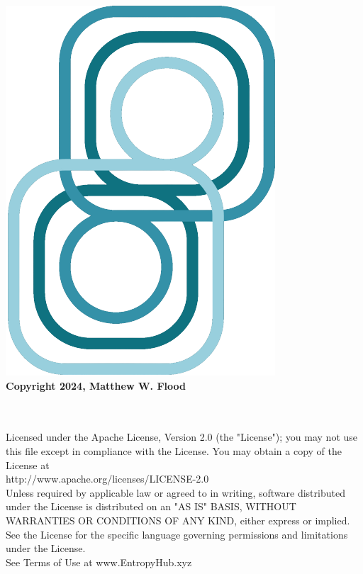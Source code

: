 \thispagestyle{plain}
	
\footnotesize

	\begingroup
	  \begin{center}	 
	  \vspace*{4cm} 
		\includegraphics[scale=.75]{EntropyHubLogo3.png}	\\	
		\vspace*{\fill}
	  \textbf{Copyright 2024, Matthew W. Flood}\\ \ \\ \
		\end{center}	   
	
	  \noindent Licensed under the Apache License, Version 2.0 (the "License");
	   you may not use this file except in compliance with the License.
	   You may obtain a copy of the License at \\	   
	
	       http://www.apache.org/licenses/LICENSE-2.0\\
	
	   \noindent Unless required by applicable law or agreed to in writing, software
	   distributed under the License is distributed on an "AS IS" BASIS,
	   WITHOUT WARRANTIES OR CONDITIONS OF ANY KIND, either express or implied.
	   See the License for the specific language governing permissions and
	   limitations under the License.\\
	   
	   \noindent See Terms of Use at www.EntropyHub.xyz\\ %
		
	\endgroup

\normalsize
	

